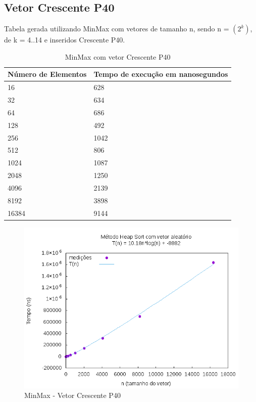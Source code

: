 \documentclass[12pt,a4paper,twoside]{report}
\begin{document}
\subsection{Vetor Crescente P40}
Tabela gerada utilizando MinMax com vetores de tamanho n, sendo n = $(2^k)$, de k = 4..14 e inseridos Crescente P40.
\begin{table}[H]
\centering
\caption{MinMax com vetor Crescente P40}
\label{my-label}
\begin{tabular}{|l|l|}
\hline
\multicolumn{1}{|c|}{\textbf{Número de Elementos}} & \multicolumn{1}{c|}{\textbf{Tempo de execução em nanosegundos}} \\ \hline
16 & 628 \\ \hline
32 & 634 \\ \hline
64 & 686 \\ \hline
128 & 492 \\ \hline
256 & 1042 \\ \hline
512 & 806 \\ \hline
1024 & 1087 \\ \hline
2048 & 1250 \\ \hline
4096 & 2139 \\ \hline
8192 & 3898 \\ \hline
16384 & 9144 \\ \hline
\end{tabular}
\end{table}

\begin{figure}[H]
    \centering
    \includegraphics[width=0.7\linewidth]{graficos/HeapSort/vIntAleatorio/vIntAleatorio.png}
  \caption{MinMax - Vetor Crescente P40}
\end{figure}
\end{document}
